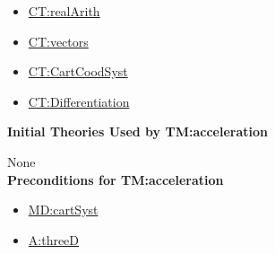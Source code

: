 \documentclass[12pt]{article}
\begin{document}
\begin{itemize}
\item \hyperref[CT:realArith]{CT:realArith}
\item \hyperref[CT:vectors]{CT:vectors}
\item \hyperref[CT:CartCoordSyst]{CT:CartCoodSyst}
\item \hyperref[CT:Differentiation]{CT:Differentiation}
\end{itemize}

\noindent \textbf{Initial Theories Used by TM:acceleration}

None
~\\

\noindent \textbf{Preconditions for TM:acceleration}

\begin{itemize}
\item \hyperref[MD:cartSyst]{MD:cartSyst}
\item \hyperref[threeD]{A:threeD}
\end{itemize}
\end{document}
